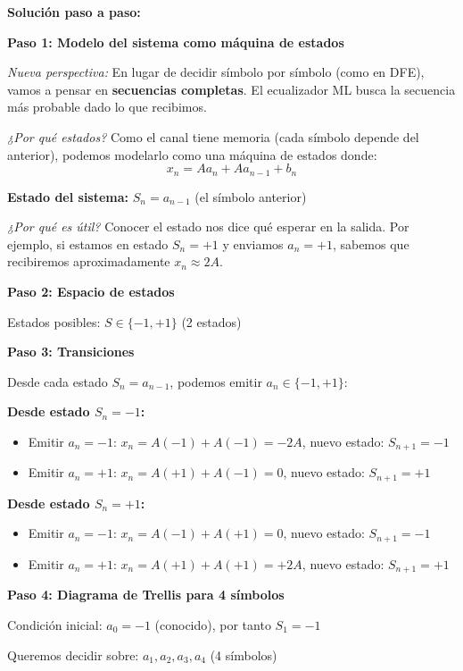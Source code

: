 \documentclass[11pt,a4paper]{article}
\begin{document}
\vspace{0.3cm}
\textbf{Solución paso a paso:}

\textbf{Paso 1: Modelo del sistema como máquina de estados}

\textit{Nueva perspectiva:} En lugar de decidir símbolo por símbolo (como en DFE), vamos a pensar en \textbf{secuencias completas}. El ecualizador ML busca la secuencia más probable dado lo que recibimos.

\textit{¿Por qué estados?} Como el canal tiene memoria (cada símbolo depende del anterior), podemos modelarlo como una máquina de estados donde:
\[
x_n = A a_n + A a_{n-1} + b_n
\]

\textbf{Estado del sistema:} $S_n = a_{n-1}$ (el símbolo anterior)

\textit{¿Por qué es útil?} Conocer el estado nos dice qué esperar en la salida. Por ejemplo, si estamos en estado $S_n = +1$ y enviamos $a_n = +1$, sabemos que recibiremos aproximadamente $x_n \approx 2A$.

\textbf{Paso 2: Espacio de estados}

Estados posibles: $S \in \{-1, +1\}$ (2 estados)

\textbf{Paso 3: Transiciones}

Desde cada estado $S_n = a_{n-1}$, podemos emitir $a_n \in \{-1, +1\}$:

\textbf{Desde estado $S_n = -1$:}
\begin{itemize}
    \item Emitir $a_n = -1$: $x_n = A(-1) + A(-1) = -2A$, nuevo estado: $S_{n+1} = -1$
    \item Emitir $a_n = +1$: $x_n = A(+1) + A(-1) = 0$, nuevo estado: $S_{n+1} = +1$
\end{itemize}

\textbf{Desde estado $S_n = +1$:}
\begin{itemize}
    \item Emitir $a_n = -1$: $x_n = A(-1) + A(+1) = 0$, nuevo estado: $S_{n+1} = -1$
    \item Emitir $a_n = +1$: $x_n = A(+1) + A(+1) = +2A$, nuevo estado: $S_{n+1} = +1$
\end{itemize}

\textbf{Paso 4: Diagrama de Trellis para 4 símbolos}

Condición inicial: $a_0 = -1$ (conocido), por tanto $S_1 = -1$

Queremos decidir sobre: $a_1, a_2, a_3, a_4$ (4 símbolos)
\end{document}
